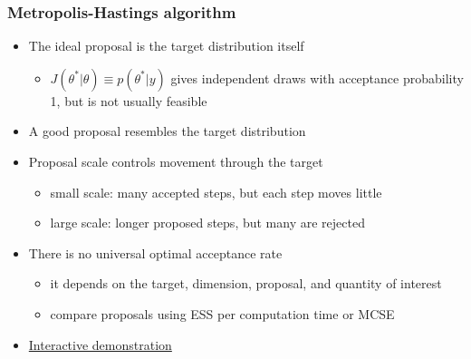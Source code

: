 \documentclass[10pt]{beamer}
\begin{document}




\begin{frame}

\frametitle{Metropolis-Hastings algorithm}

  \begin{itemize}
  \item The ideal proposal is the target distribution itself
    \begin{itemize}
    \item $J(\theta^{*}|\theta)\equiv p(\theta^{*}|y)$ gives independent
      draws with acceptance probability 1, but is not usually feasible
    \end{itemize}
  \item<2-> A good proposal resembles the target distribution
  \item<3-> Proposal scale controls movement through the target
    \begin{itemize}
    \item small scale: many accepted steps, but each step moves little
    \item large scale: longer proposed steps, but many are rejected
    \end{itemize}
  \item<4-> There is no universal optimal acceptance rate
    \begin{itemize}
    \item it depends on the target, dimension, proposal, and quantity
      of interest
    \item compare proposals using ESS per computation time or MCSE
    \end{itemize}
  \item<5-> \href{https://chi-feng.github.io/mcmc-demo/app.html?algorithm=RandomWalkMH&target=standard}{Interactive demonstration}
\end{itemize}

\end{frame}
\end{document}
